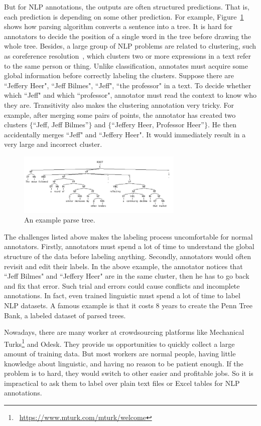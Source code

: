 But for NLP annotations, the outputs are often structured predictions. That is, each prediction is depending on some other prediction. For example, Figure~\ref{fig:example_parse_tree} shows how parsing algorithm converts a sentence into a tree. It is hard for annotators to decide the position of a single word in the tree before drawing the whole tree. Besides, a large group of NLP problems are related to clustering, such as coreference resolution~\cite{lee2011stanford}, which clusters two or more expressions in a text refer to the same person or thing. Unlike classification, annotates must acquire some global information before correctly labeling the clusters. Suppose there are ``Jeffery Heer", ``Jeff Bilmes", ``Jeff", ``the professor" in a text. To decide whether which ``Jeff" and which ``professor", annotator must read the context to know who they are. Transitivity also makes the clustering annotation very tricky. For example, after merging some pairs of points, the annotator has created two clusters $\{$``Jeff, Jeff Bilmes''$\}$ and $\{$``Jeffery Heer, Professor Heer''$\}$. He then accidentally merges ``Jeff" and ``Jeffery Heer".  It would immediately result in a very large and incorrect cluster.


\begin{figure}
\centering
\includegraphics[width=3.1in]{figs/parsetree.png}
\caption{An example parse tree.}
\label{fig:example_parse_tree}
\end{figure}


The challenges listed above makes the labeling process uncomfortable for normal annotators. Firstly, annotators must spend a lot of time to understand the global structure of the data before labeling anything. Secondly, annotators would often revisit and edit their labels. In the above example, the annotator notices that ``Jeff Bilmes" and ``Jeffery Heer" are in the same cluster, then he has to go back and fix that error. Such trial and errors could cause conflicts and incomplete annotations. In fact, even trained linguistic must spend a lot of time to label NLP datasets. A famous example is that it costs 8 years to create the Penn Tree Bank, a labeled dataset of parsed trees. 

Nowadays, there are many worker at crowdsourcing platforms like Mechanical Turks\footnote{~\url{https://www.mturk.com/mturk/welcome}} and Odesk. They provide us opportunities to quickly collect a large amount of training data. But most workers are normal people, having little knowledge about linguistic, and having no reason to be patient enough. If the problem is to hard, they would switch to other easier and profitable jobs. So it is impractical to ask them to label over plain text files or Excel tables for NLP annotations.  